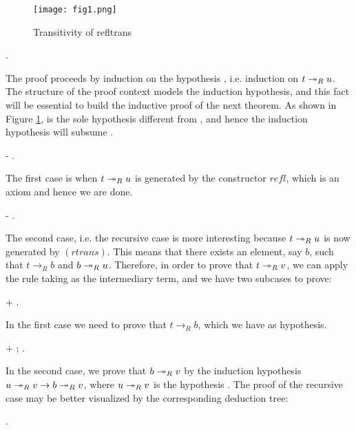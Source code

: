       \begin{figure}\texttt{[image: fig1.png]}
      \caption{Transitivity of refltrans}
      \label{fig:trans}\end{figure} \begin{coqdoccode}
\coqdocemptyline
\coqdocindent{1.00em}
 . \end{coqdoccode}
The proof proceeds by induction on the hypothesis
      , i.e. induction on $t \tto_R u$. The structure of the proof
      context models the induction hypothesis, and this fact will be
      essential to build the inductive proof of the next theorem. As
      shown in Figure \ref{fig:trans},  is the sole hypothesis
      different from , and hence the induction hypothesis will
      subsume . \begin{coqdoccode}
\coqdocemptyline
\coqdocindent{1.00em}
- . \end{coqdoccode}
The first case is when $t \tto_R u$ is generated
      by the constructor $refl$, which is an axiom and hence we are
      done. \begin{coqdoccode}
\coqdocemptyline
\coqdocindent{1.00em}
-    . \end{coqdoccode}
The second case, i.e. the recursive case
      is more interesting because $t \tto_R u$ is now generated by
      $(rtrans)$. This means that there exists an element, say $b$,
      such that $t \to_R b$ and $b \tto_R u$. Therefore, in order to
      prove that $t \tto_R v$, we can apply the rule  taking
       as the intermediary term, and we have two subcases to
      prove: \begin{coqdoccode}
\coqdocemptyline
\coqdocindent{2.00em}
+ . \end{coqdoccode}
In the first case we need to prove that $t \to_R
    b$, which we have as hypothesis. \begin{coqdoccode}
\coqdocemptyline
\coqdocindent{2.00em}
+  ; . \end{coqdoccode}
In the second case, we prove
    that $b \tto_R v$ by the induction hypothesis $u \tto_R v \to b
    \tto_R v$, where $u\tto_R v$ is the hypothesis . The proof of
    the recursive case may be better visualized by the corresponding
    deduction tree: {\scriptsize \begin{mathpar}
    \end{mathpar}} \begin{coqdoccode}
\coqdocnoindent
{}.\coqdoceol
\coqdocemptyline
\end{coqdoccode}
